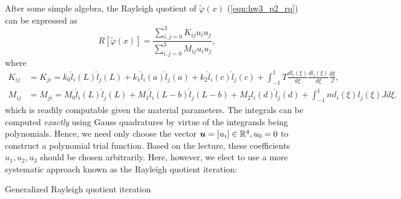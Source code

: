 \begin{enumerate}[(i)]
{    After some simple algebra, the Rayleigh quotient of $\tilde{\varphi}(x)$ (\cref{eqn:hw3_p2_rq}) can be expressed as 
    \begin{equation}\label{eqn:hw3_p2_rq_poly}
        R[\tilde{\varphi}(x)] = \frac{\sum_{i,j=0}^3 K_{ij}u_i u_j}{\sum_{i,j=0}^3 M_{ij}u_i u_j},
    \end{equation}
    where 
    \begin{equation}\label{eqn:hw3_p2_KM}
    \begin{aligned}
        K_{ij} &= K_{ji} = k_0 \hat{l}_i(L) \hat{l}_j(L) + k_1 \hat{l}_i(a) \hat{l}_j(a) + k_2 \hat{l}_i(c) \hat{l}_j(c) + \int_{-1}^1 T \frac{dl_i(\xi)}{d\xi} \frac{dl_i(\xi)}{d\xi} \frac{d\xi}{J}, \\
        M_{ij} &= M_{ji} = M_0 \hat{l}_i(L) \hat{l}_j(L) + M_1 \hat{l}_i(L-b) \hat{l}_j(L-b) + M_2 \hat{l}_i(d) \hat{l}_j(d) + \int_{-1}^1 m l_i(\xi) l_j(\xi) J d\xi.
    \end{aligned}
    \end{equation}
    which is readily computable given the material parameters. 
    The integrals can be computed \emph{exactly} using Gauss quadratures by virtue of the integrands being polynomials. 
    Hence, we need only choose the vector $\bm{u} = [u_i] \in \mathbb{R}^4, u_0 = 0$ to construct a polynomial trial function. 
    Based on the lecture, these coefficients $u_1, u_2, u_3$ should be chosen arbitrarily. 
    Here, however, we elect to use a more systematic approach known as the Rayleigh quotient iteration:
    \begin{algorithm}[!ht]
        \caption{Generalized Rayleigh quotient iteration}
        \begin{algorithmic}
        \label{alg:hw3_p2_rq_iter}
        \setlength{\lineskip}{4pt}
        \EndFor
        \end{algorithmic}
    \end{algorithm}

}
\end{enumerate}
